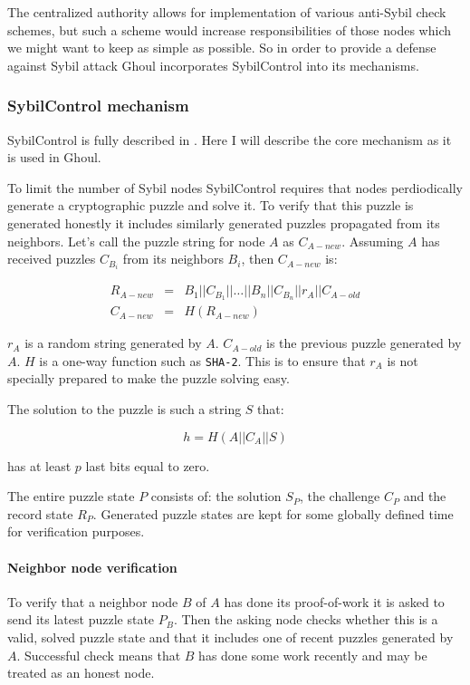  The centralized authority allows for implementation of various anti-Sybil
  check schemes, but such a scheme would increase responsibilities of those
  nodes which we might want to keep as simple as possible. So in order to
  provide a defense against Sybil attack Ghoul incorporates SybilControl into
  its mechanisms.

\subsubsection{SybilControl mechanism}
  SybilControl is fully described in \cite{li12}. Here I will describe the core
  mechanism as it is used in Ghoul. 

  To limit the number of Sybil nodes SybilControl requires that nodes
  perdiodically generate a cryptographic puzzle and solve it. To verify that
  this puzzle is generated honestly it includes similarly generated puzzles
  propagated from its neighbors. Let's call the puzzle string for node $A$ as
  $C_{A-new}$. Assuming $A$ has received puzzles $C_{B_i}$ from its neighbors
  $B_{i}$, then $C_{A-new}$ is:

  \begin{eqnarray*}
      R_{A-new} &=& B_1||C_{B_1}||\ldots||B_n||C_{B_n}||r_A||C_{A-old}\\
    C_{A-new} &=& H\left(R_{A-new}\right)
  \end{eqnarray*}

  $r_A$ is a random string generated by $A$. $C_{A-old}$ is the previous puzzle
  generated by $A$. $H$ is a one-way function such as \texttt{SHA-2}. This is to
  ensure that $r_A$ is not specially prepared to make the puzzle solving easy.

  The solution to the puzzle is such a string $S$ that:

  \[ h = H\left(A||C_A||S\right)\]

  has at least $p$ last bits equal to zero.

  The entire puzzle state $P$ consists of: the solution $S_P$, the challenge
  $C_P$ and the record state $R_P$. Generated puzzle states are kept for some
  globally defined time for verification purposes.

  \paragraph{Neighbor node verification}
  To verify that a neighbor node $B$ of $A$ has done its proof-of-work it is
  asked to send its latest puzzle state $P_B$. Then the asking node checks
  whether this is a valid, solved puzzle state and that it includes one of
  recent puzzles generated by $A$. Successful check means that $B$ has done some
  work recently and may be treated as an honest node.


